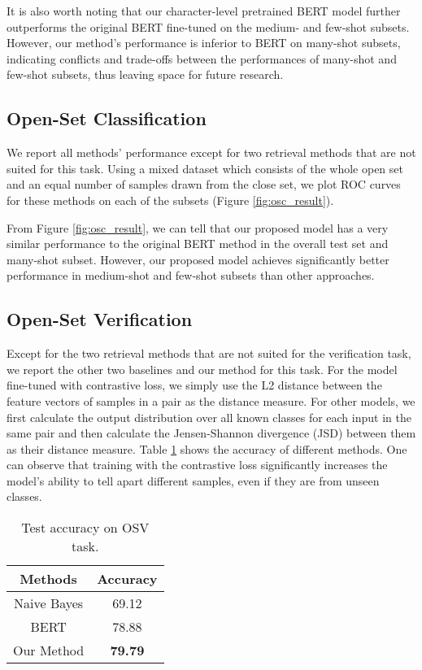 \documentclass{article}
\begin{document}
It is also worth noting that our character-level pretrained BERT model further outperforms the original BERT fine-tuned on the medium- and few-shot subsets. However, our method's performance is inferior to BERT on many-shot subsets, indicating conflicts and trade-offs between the performances of many-shot and few-shot subsets, thus leaving space for future research.

\subsection{Open-Set Classification}
We report all methods' performance except for two retrieval methods that are not suited for this task. Using a mixed dataset which consists of the whole open set and an equal number of samples drawn from the close set, we plot ROC curves for these methods on each of the subsets (Figure \ref{fig:osc_result}).

From Figure \ref{fig:osc_result}, we can tell that our proposed model has a very similar performance to the original BERT method in the overall test set and many-shot subset. However, our proposed model achieves significantly better performance in medium-shot and few-shot subsets than other approaches. 

\subsection{Open-Set Verification}
Except for the two retrieval methods that are not suited for the verification task, we report the other two baselines and our method for this task. For the model fine-tuned with contrastive loss, we simply use the L2 distance between the feature vectors of samples in a pair as the distance measure. For other models, we first calculate the output distribution over all known classes for each input in the same pair and then calculate the Jensen-Shannon divergence (JSD) between them as their distance measure. 
Table \ref{tab:task3} shows the accuracy of different methods. One can observe that training with the contrastive loss significantly increases the model's ability to tell apart different samples, even if they are from unseen classes. 

\begin{table}[t]
    \centering
    \begin{tabular}{cc}
    \toprule
       Methods  &  Accuracy \\ \midrule
       Naive Bayes  &  69.12   \\
       BERT  &  78.88 \\
Our Method  &  \textbf{79.79}  \\
      \bottomrule
    \end{tabular}
    \caption{Test accuracy on OSV task.}
    \label{tab:task3}
\end{table}
\end{document}
